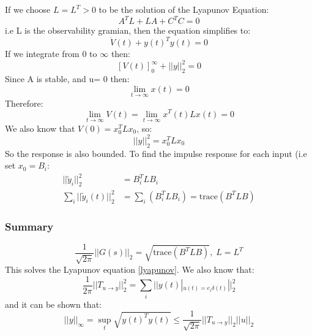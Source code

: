 \documentclass{article}
\begin{document}
If we choose $L = L^T >0$ to be the solution of the Lyapunov Equation:
\begin{equation}\label{lyapunov}
    A^T L + LA + C^TC = 0
\end{equation}
i.e L is the observability gramian, then the equation simplifies to:
\[
\dot V(t) + y(t)^T y(t) = 0
\]
If we integrate from 0 to $\infty$ then:
\[
[V(t)]_{0}^\infty + ||y||_2^2 = 0
\]
Since A is stable, and u= 0 then:
\[
\lim_{t \rightarrow \infty} x(t) = 0
\]
Therefore:
\[
\lim_{t \rightarrow \infty} V(t) = \lim_{t \rightarrow \infty} x^T (t) L x(t) = 0
\]
We also know that $V(0) = x_0^T L x_0$, so:
\[
||y||_2^2 = x_0^T L x_0
\]
So the response is also bounded. To find the impulse response for each input (i.e set $x_0 = B_i$: 
\[ 
\begin{aligned}
|| \tilde y_i ||_2^2 &= B_i^T L B_i \\
\sum_i || \tilde y_i(t)||_2^2 &= \sum_i (B_i^T L B_i) = \text{trace} (B^T L B)
\end{aligned}
\]
\subsubsection*{Summary}
\[
\frac{1}{\sqrt{2 \pi}} ||G(s)||_2 = \sqrt{\text{trace} (B^T L B)}, \; L = L^T
\]
This solves the Lyapunov equation \eqref{lyapunov}. We also know that: \[
\frac{1}{2 \pi} ||T_{u \rightarrow y}||_2^2 = \sum_i ||y(t)|_{u(t) = e_i \delta(t)}||_2^2
\]
and it can be shown that: 
\[
||y||_\infty = \sup_t \sqrt{y(t)^T y(t)} \leq \frac{1}{\sqrt{2 \pi}} ||T_{u \rightarrow y}||_2 ||u||_2
\]
\end{document}
